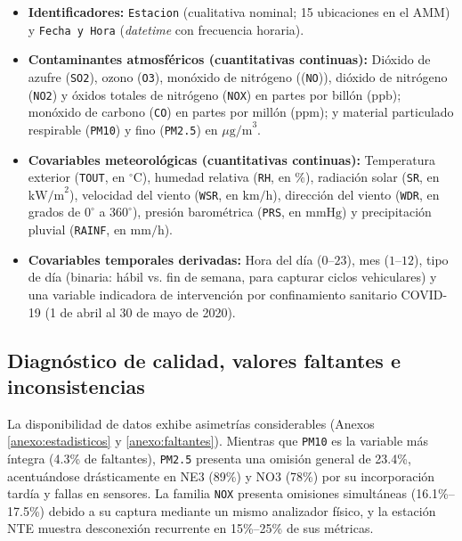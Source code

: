 \documentclass[11pt]{article}
\begin{document}
\begin{itemize}
    \item \textbf{Identificadores:} \texttt{Estacion} (cualitativa nominal; 15 ubicaciones en el AMM) y \texttt{Fecha y Hora} (\textit{datetime} con frecuencia horaria).

    \item \textbf{Contaminantes atmosféricos (cuantitativas continuas):} Dióxido de azufre (\texttt{SO2}), ozono (\texttt{O3}), monóxido de nitrógeno ((\texttt{NO})), dióxido de nitrógeno (\texttt{NO2}) y óxidos totales de nitrógeno (\texttt{NOX}) en partes por billón ($\text{ppb}$); monóxido de carbono (\texttt{CO}) en partes por millón ($\text{ppm}$); y material particulado respirable (\texttt{PM10}) y fino (\texttt{PM2.5}) en $\mu\text{g/m}^3$. 

    \item \textbf{Covariables meteorológicas (cuantitativas continuas):} Temperatura exterior (\texttt{TOUT}, en $^\circ\text{C}$), humedad relativa (\texttt{RH}, en $\%$), radiación solar (\texttt{SR}, en $\text{kW/m}^2$), velocidad del viento (\texttt{WSR}, en $\text{km/h}$), dirección del viento (\texttt{WDR}, en grados de $0^\circ$ a $360^\circ$), presión barométrica (\texttt{PRS}, en $\text{mmHg}$) y precipitación pluvial (\texttt{RAINF}, en $\text{mm/h}$).

    \item \textbf{Covariables temporales derivadas:} Hora del día ($0\text{--}23$), mes ($1\text{--}12$), tipo de día (binaria: hábil vs. fin de semana, para capturar ciclos vehiculares) y una variable indicadora de intervención por confinamiento sanitario COVID-19 (1 de abril al 30 de mayo de 2020).

\end{itemize}

\subsection{Diagnóstico de calidad, valores faltantes e inconsistencias}
La disponibilidad de datos exhibe asimetrías considerables (Anexos \ref{anexo:estadisticos} y \ref{anexo:faltantes}). Mientras que \texttt{PM10} es la variable más íntegra (4.3\% de faltantes), \texttt{PM2.5} presenta una omisión general de 23.4\%, acentuándose drásticamente en NE3 (89\%) y NO3 (78\%) por su incorporación tardía y fallas en sensores. La familia \texttt{NOX} presenta omisiones simultáneas (16.1\%--17.5\%) debido a su captura mediante un mismo analizador físico, y la estación NTE muestra desconexión recurrente en 15\%--25\% de sus métricas.
\end{document}
